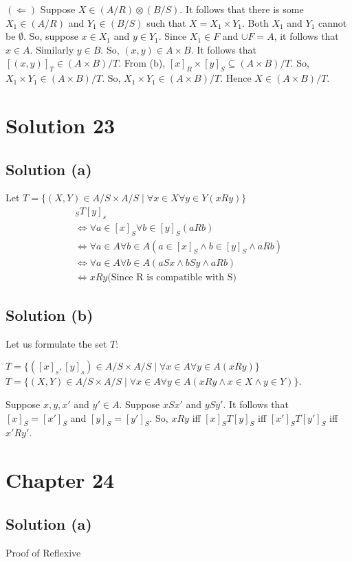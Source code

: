 \documentclass{article}
\begin{document}
$(\Leftarrow)$ Suppose $X \in (A/R) \otimes (B/S)$. It follows that
there is some $X_1 \in (A/R)$ and $Y_1 \in (B/S)$ such that $X=X_1
\times Y_1$. Both $X_1$ and $Y_1$ cannot be $\emptyset$. So, suppose
$x \in X_1$ and $y \in Y_1$. Since $X_1 \in F$ and $\cup F = A$, it
follows that $x \in A$. Similarly $y \in B$. So, $(x,y) \in A \times
B$. It follows that $[(x,y)]_T \in (A \times B)/T$. From (b), $[x]_R
\times [y]_S \subseteq (A \times B)/T$. So, $X_1 \times Y_1 \in (A
\times B)/T$. So, $X_1 \times Y_1 \in (A \times B)/T$. Hence $X \in (A
\times B)/T$.

\section{Solution 23}
\subsection{Solution (a)}
Let $T = \{(X,Y) \in A/S \times A/S \mid \forall x \in X \forall y \in Y(xRy)\}$
\begin{align*}
  [x]_ST[y]_s \\
  \iff \forall a \in [x]_S \forall b \in [y]_S (aRb) \\
  \iff \forall a \in A \forall b \in A (a \in [x]_S \land b \in [y]_S \land aRb) \\
  \iff \forall a \in A \forall b \in A (aSx \land bSy \land aRb) \\
  \iff xRy          \text{(Since R is compatible with S)}
\end{align*}

\subsection{Solution (b)}
Let us formulate the set $T$:

$T = \{([x]_s, [y]_s) \in A/S \times A/S \mid \forall x \in A \forall
y \in A(xRy)\}$ \\
$T = \{(X,Y) \in A/S \times A/S \mid \forall x \in A \forall y \in
A(xRy \land x \in X \land y \in Y)\}$.

Suppose $x,y,x'$ and $y' \in A$. Suppose $xSx'$ and $ySy'$. It follows
that $[x]_S = [x']_S$ and $[y]_S = [y']_S$. So, $xRy$ iff
$[x]_ST[y]_S$ iff $[x']_ST[y']_S$ iff $x'Ry'$.

\section{Chapter 24}
\subsection{Solution (a)}
Proof of Reflexive \\
\end{document}
